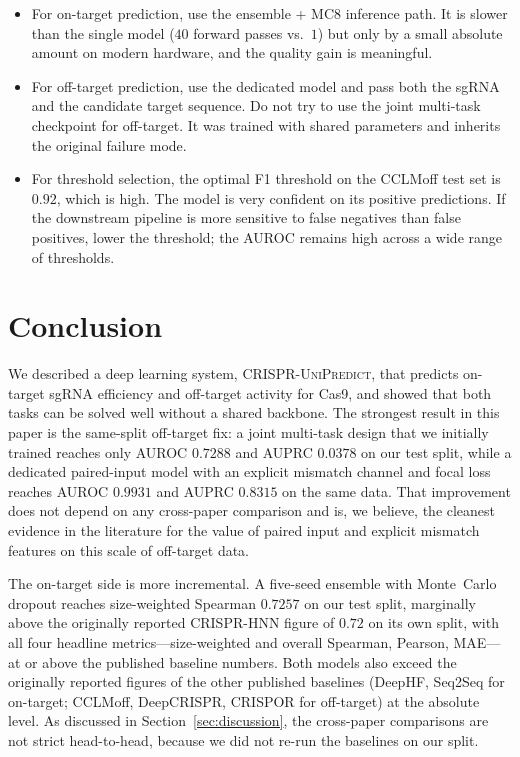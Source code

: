 \documentclass[11pt,a4paper]{article}
\begin{document}
\begin{itemize}[leftmargin=*,topsep=2pt,itemsep=2pt]
\item For on-target prediction, use the ensemble + MC8 inference path. It is slower than the single model ($40$ forward passes vs.\ $1$) but only by a small absolute amount on modern hardware, and the quality gain is meaningful.
\item For off-target prediction, use the dedicated model and pass both the sgRNA and the candidate target sequence. Do not try to use the joint multi-task checkpoint for off-target. It was trained with shared parameters and inherits the original failure mode.
\item For threshold selection, the optimal F1 threshold on the CCLMoff test set is $0.92$, which is high. The model is very confident on its positive predictions. If the downstream pipeline is more sensitive to false negatives than false positives, lower the threshold; the AUROC remains high across a wide range of thresholds.
\end{itemize}

\section{Conclusion}

We described a deep learning system, \textsc{CRISPR-UniPredict}, that predicts on-target sgRNA efficiency and off-target activity for Cas9, and showed that both tasks can be solved well without a shared backbone. The strongest result in this paper is the same-split off-target fix: a joint multi-task design that we initially trained reaches only AUROC $0.7288$ and AUPRC $0.0378$ on our test split, while a dedicated paired-input model with an explicit mismatch channel and focal loss reaches AUROC $0.9931$ and AUPRC $0.8315$ on the same data. That improvement does not depend on any cross-paper comparison and is, we believe, the cleanest evidence in the literature for the value of paired input and explicit mismatch features on this scale of off-target data.

The on-target side is more incremental. A five-seed ensemble with Monte~Carlo dropout reaches size-weighted Spearman $0.7257$ on our test split, marginally above the originally reported CRISPR-HNN figure of $0.72$ on its own split, with all four headline metrics---size-weighted and overall Spearman, Pearson, MAE---at or above the published baseline numbers. Both models also exceed the originally reported figures of the other published baselines (DeepHF, Seq2Seq for on-target; CCLMoff, DeepCRISPR, CRISPOR for off-target) at the absolute level. As discussed in Section~\ref{sec:discussion}, the cross-paper comparisons are not strict head-to-head, because we did not re-run the baselines on our split.
\end{document}
